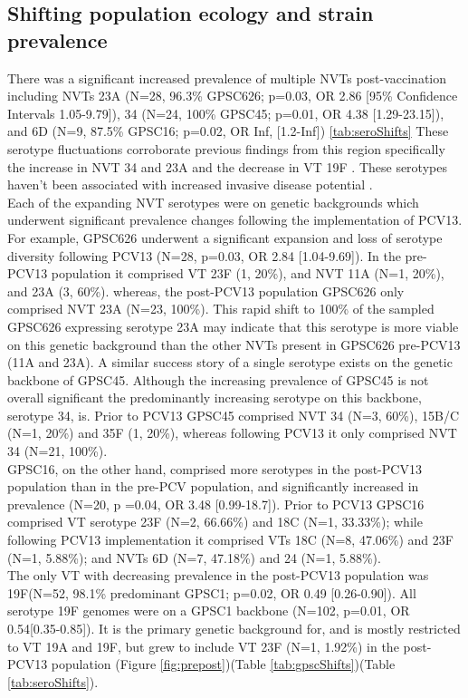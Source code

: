 \documentclass{article}
\begin{document}
\subsection{Shifting population ecology and strain prevalence}
There was a significant increased prevalence of multiple NVTs post-vaccination including NVTs 23A (N=28, 96.3\% GPSC626; p=0.03, OR 2.86 [95\% Confidence Intervals 1.05-9.79]), 34 (N=24, 100\% GPSC45; p=0.01, OR 4.38 [1.29-23.15]), and 6D (N=9, 87.5\% GPSC16; p=0.02, OR Inf, [1.2-Inf]) \ref{tab:seroShifts} These serotype fluctuations corroborate previous findings from this region specifically the increase in NVT 34 and 23A and the decrease in VT 19F \cite{turnerImpact13ValentPneumococcal2020}. These serotypes haven't been associated with increased invasive disease potential \cite{balsellsRelativeInvasiveDisease2018}.
\\Each of the expanding NVT serotypes were on genetic backgrounds which underwent significant prevalence changes following the implementation of PCV13. For example, GPSC626 underwent a significant expansion and loss of serotype diversity following PCV13 (N=28, p=0.03, OR 2.84 [1.04-9.69]). In the pre-PCV13 population it comprised VT 23F (1, 20\%), and NVT 11A (N=1, 20\%), and 23A (3, 60\%). whereas, the post-PCV13 population GPSC626 only comprised NVT 23A (N=23, 100\%).  This rapid shift to 100\% of the sampled GPSC626 expressing serotype 23A may indicate that this serotype is more viable on this genetic background than the other NVTs present in GPSC626 pre-PCV13 (11A and 23A). A similar success story of a single serotype exists on the genetic backbone of GPSC45. Although the increasing prevalence of GPSC45 is not overall significant the predominantly increasing serotype on this backbone, serotype 34, is. Prior to PCV13 GPSC45 comprised NVT 34 (N=3, 60\%), 15B/C (N=1, 20\%) and 35F (1, 20\%), whereas following PCV13 it only comprised NVT 34 (N=21, 100\%). 
\\GPSC16, on the other hand, comprised more serotypes in the post-PCV13 population than in the pre-PCV population, and significantly increased in prevalence (N=20, p =0.04, OR 3.48 [0.99-18.7]). Prior to PCV13 GPSC16 comprised VT serotype 23F (N=2, 66.66\%) and 18C (N=1, 33.33\%); while following PCV13 implementation it comprised VTs 18C (N=8, 47.06\%) and 23F (N=1, 5.88\%); and NVTs 6D (N=7, 47.18\%) and 24 (N=1, 5.88\%).
\\The only VT with decreasing prevalence in the post-PCV13 population was 19F(N=52, 98.1\% predominant GPSC1; p=0.02, OR 0.49 [0.26-0.90]). All serotype 19F genomes were on a GPSC1 backbone (N=102, p=0.01, OR 0.54[0.35-0.85]). It is the primary genetic background for, and is mostly restricted to VT 19A and 19F, but grew to include VT 23F (N=1, 1.92\%) in the post-PCV13 population (Figure \ref{fig:prepost})(Table \ref{tab:gpscShifts})(Table \ref{tab:seroShifts}). 
\end{document}
